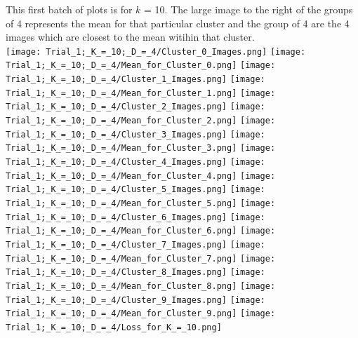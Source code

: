 \documentclass[submit]{harvardml}
\begin{document}
	This first batch of plots is for $k$ = 10. The large image to the right of the groups of 4 represents the mean for that particular cluster and the group of 4 are the 4 images which are closest to the mean witihin that cluster. \\
	\texttt{[image: Trial\_1;\_K\_=\_10;\_D\_=\_4/Cluster\_0\_Images.png]}
	\texttt{[image: Trial\_1;\_K\_=\_10;\_D\_=\_4/Mean\_for\_Cluster\_0.png]}
	\texttt{[image: Trial\_1;\_K\_=\_10;\_D\_=\_4/Cluster\_1\_Images.png]}
	\texttt{[image: Trial\_1;\_K\_=\_10;\_D\_=\_4/Mean\_for\_Cluster\_1.png]}
	\texttt{[image: Trial\_1;\_K\_=\_10;\_D\_=\_4/Cluster\_2\_Images.png]}
	\texttt{[image: Trial\_1;\_K\_=\_10;\_D\_=\_4/Mean\_for\_Cluster\_2.png]}
	\texttt{[image: Trial\_1;\_K\_=\_10;\_D\_=\_4/Cluster\_3\_Images.png]}
	\texttt{[image: Trial\_1;\_K\_=\_10;\_D\_=\_4/Mean\_for\_Cluster\_3.png]}
	\texttt{[image: Trial\_1;\_K\_=\_10;\_D\_=\_4/Cluster\_4\_Images.png]}
	\texttt{[image: Trial\_1;\_K\_=\_10;\_D\_=\_4/Mean\_for\_Cluster\_4.png]}
	\texttt{[image: Trial\_1;\_K\_=\_10;\_D\_=\_4/Cluster\_5\_Images.png]}
	\texttt{[image: Trial\_1;\_K\_=\_10;\_D\_=\_4/Mean\_for\_Cluster\_5.png]}
	\texttt{[image: Trial\_1;\_K\_=\_10;\_D\_=\_4/Cluster\_6\_Images.png]}
	\texttt{[image: Trial\_1;\_K\_=\_10;\_D\_=\_4/Mean\_for\_Cluster\_6.png]}
	\texttt{[image: Trial\_1;\_K\_=\_10;\_D\_=\_4/Cluster\_7\_Images.png]}
	\texttt{[image: Trial\_1;\_K\_=\_10;\_D\_=\_4/Mean\_for\_Cluster\_7.png]}
	\texttt{[image: Trial\_1;\_K\_=\_10;\_D\_=\_4/Cluster\_8\_Images.png]}
	\texttt{[image: Trial\_1;\_K\_=\_10;\_D\_=\_4/Mean\_for\_Cluster\_8.png]}
	\texttt{[image: Trial\_1;\_K\_=\_10;\_D\_=\_4/Cluster\_9\_Images.png]}
	\texttt{[image: Trial\_1;\_K\_=\_10;\_D\_=\_4/Mean\_for\_Cluster\_9.png]}
	\texttt{[image: Trial\_1;\_K\_=\_10;\_D\_=\_4/Loss\_for\_K\_=\_10.png]} 
	\\\\
\end{document}
